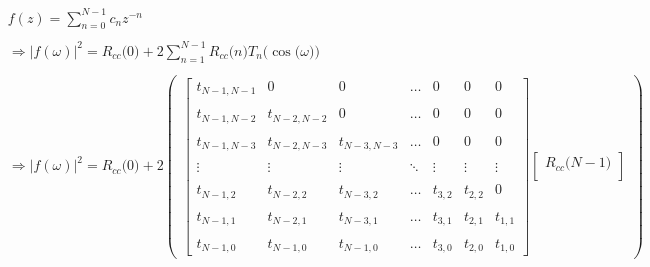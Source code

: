 \documentclass{article}
\begin{document}
\begin{align*}
    & \\ \\
    & f(z) = \sum_{n = 0}^{N - 1}c_{n}z^{-n} \\ \\
    &\Rightarrow |f(\omega)|^{2} = R_{cc}\big(0\big) + 2\sum_{n=1}^{N - 1}R_{cc}\big(n\big)T_{n}\Big(\cos\big(\omega\big)\Big) \\ \\ 
    &\Rightarrow |f(\omega)|^{2} = R_{cc}\big(0\big) + 2\begin{pmatrix}
                                                            \begin{bmatrix}
                                                                t_{N - 1, N - 1} &                0 &                0 & \ldots &        0 &        0 &        0 \\ \\
                                                                t_{N - 1, N - 2} & t_{N - 2, N - 2} &                0 & \ldots &        0 &        0 &        0 \\ \\
                                                                t_{N - 1, N - 3} & t_{N - 2, N - 3} & t_{N - 3, N - 3} & \ldots &        0 &        0 &        0 \\ \\
                                                                \vdots &           \vdots &           \vdots & \ddots &   \vdots &   \vdots &   \vdots \\ \\
                                                                t_{N - 1,     2} & t_{N - 2,     2} & t_{N - 3,     2} & \ldots & t_{3, 2} & t_{2, 2} &        0 \\ \\
                                                                t_{N - 1,     1} & t_{N - 2,     1} & t_{N - 3,     1} & \ldots & t_{3, 1} & t_{2, 1} & t_{1, 1} \\ \\
                                                                t_{N - 1,     0} & t_{N - 1,     0} & t_{N - 1,     0} & \ldots & t_{3, 0} & t_{2, 0} & t_{1, 0} 
                                                              \end{bmatrix}
                                                            \begin{bmatrix}
                                                                R_{cc}\big(N - 1\big) \\

\end{bmatrix}
\end{pmatrix}
\end{align*}
\end{document}

